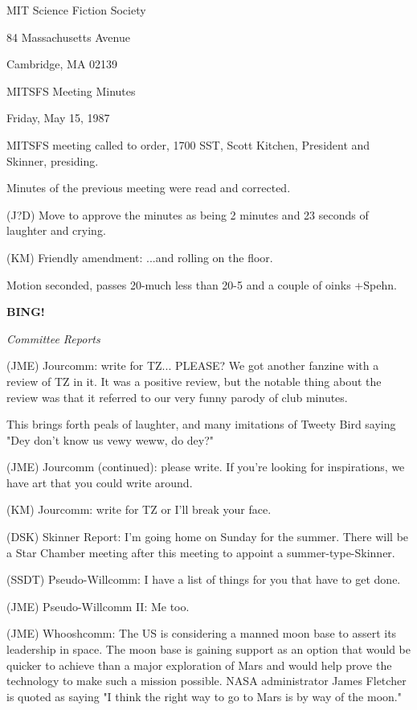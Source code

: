 \documentclass[12pt]{article}
\newcommand{\bing}{{\bf BING!} }
\newcommand{\goto}[1]{\bing \vskip 12pt \centerline{{\em{#1}}}}
\begin{document}
\begin{center}

MIT Science Fiction Society 

84 Massachusetts Avenue

Cambridge, MA 02139

\vspace{12pt}

MITSFS Meeting Minutes 

Friday, May 15, 1987

\end{center}
 
\vspace{18pt}

\setlength{\parskip}{6pt}

\noindent
MITSFS meeting called to order, 1700 SST, Scott Kitchen, President and Skinner, presiding.

Minutes of the previous meeting were read and corrected.

(J?D) Move to approve the minutes as being 2 minutes and 23 seconds of laughter and crying.

(KM) Friendly amendment: ...and rolling on the floor.

Motion seconded, passes 20-much less than 20-5 and a couple of oinks +Spehn.

\goto{Committee Reports}

(JME) Jourcomm: write for TZ... PLEASE? We got another fanzine with a review of TZ in it. It was a positive review, but the notable thing about the review was that it referred to our very funny parody of club minutes.

This brings forth peals of laughter, and many imitations of Tweety Bird saying "Dey don't know us vewy weww, do dey?"

(JME) Jourcomm (continued): please write. If you're looking for inspirations, we have art that you could write around.

(KM) Jourcomm: write for TZ or I'll break your face.

(DSK) Skinner Report: I'm going home on Sunday for the summer. There will be a Star Chamber meeting after this meeting to appoint a summer-type-Skinner.

(SSDT) Pseudo-Willcomm: I have a list of things for you that have to get done.

(JME) Pseudo-Willcomm II: Me too.

(JME) Whooshcomm: The US is considering a manned moon base to assert its leadership in space. The moon base is gaining support as an option that would be quicker to achieve than a major exploration of Mars and would help prove the technology to make such a mission possible. NASA administrator James Fletcher is quoted as saying "I think the right way to go to Mars is by way of the moon."
\end{document}
